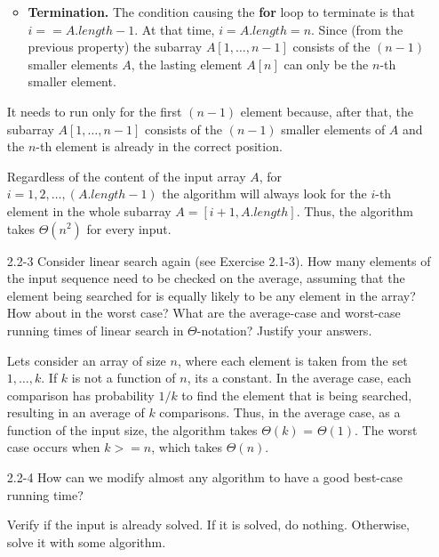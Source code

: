 \documentclass{report}
\makeatletter
\renewenvironment{framed}{%
 \def\FrameCommand##1{\hskip\@totalleftmargin
 \fboxsep=\FrameSep\fbox{##1}}%
 \MakeFramed {\advance\hsize-\width
   \@totalleftmargin\z@ \linewidth\hsize
   \@setminipage}}%
 {\par\unskip\endMakeFramed}
\makeatother
\begin{document}
\begin{enumerate}
\begin{framed}
\begin{itemize}
  \item \textbf{Termination.} The condition causing the \textbf{for} loop to
    terminate is that $i == A.length - 1$. At that time, $i = A.length = n$.
    Since (from the previous property) the subarray $A[1, \dots, n - 1]$
    consists of the $(n - 1)$ smaller elements $A$, the lasting element $A[n]$
    can only be the $n$-th smaller element.
\end{itemize}

It needs to run only for the first $(n - 1)$ element because, after that, the
subarray $A[1, \dots, n - 1]$ consists of the $(n - 1)$ smaller elements
of $A$ and the $n$-th element is already in the correct position.

Regardless of the content of the input array $A$, for
$i = 1, 2, \dots, (A.length - 1)$ the algorithm will always look for the $i$-th
element in the whole subarray $A = [i + 1, A.length]$. Thus, the algorithm takes
$\Theta(n^2)$ for every input.
\end{framed}

\item[2.2{-}3]{Consider linear search again (see Exercise 2.1-3). How many
elements of the input sequence need to be checked on the average, assuming
that the element being searched for is equally likely to be any element in
the array? How about in the worst case? What are the average-case and
worst-case running times of linear search in $\Theta$-notation? Justify your
answers.}

\begin{framed}
Lets consider an array of size $n$, where each element is taken from the set $1,
\dots, k$. If $k$ is not a function of $n$, its a constant. In the average case,
each comparison has probability $1/k$ to find the element that is being
searched, resulting in an average of $k$ comparisons. Thus, in the average case,
as a function of the input size, the algorithm takes $\Theta(k)$ = $\Theta(1)$.
The worst case occurs when $k >= n$, which takes $\Theta(n)$.
\end{framed}

\item[2.2{-}4]{How can we modify almost any algorithm to have a good best-case
  running time?}

\begin{framed}
Verify if the input is already solved. If it is solved, do nothing. Otherwise,
solve it with some algorithm.
\end{framed}

\end{enumerate}
\end{document}
